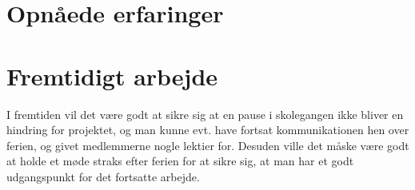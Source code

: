 \section{Opnåede erfaringer}

\section{Fremtidigt arbejde}
I fremtiden vil det være godt at sikre sig at en pause i skolegangen ikke bliver en hindring for projektet, og man kunne evt. have fortsat kommunikationen 
hen over ferien, og givet medlemmerne nogle lektier for. Desuden ville det måske være godt at holde et møde straks efter ferien for at sikre sig, at man har 
et godt udgangspunkt for det fortsatte arbejde.  